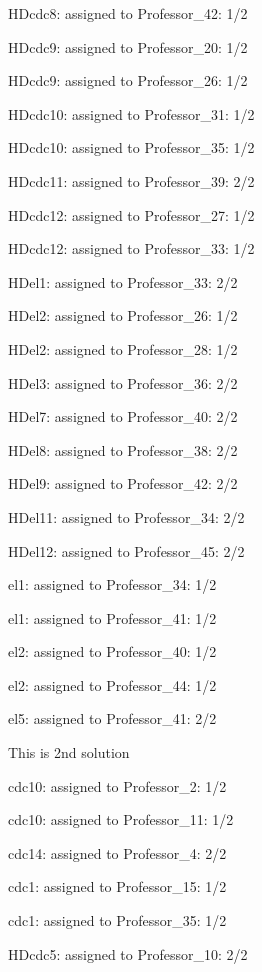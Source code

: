 \documentclass{article} %
\begin{document}
\noindent HDcdc8: assigned to Professor\_42: 1/2

\noindent HDcdc9: assigned to Professor\_20: 1/2

\noindent HDcdc9: assigned to Professor\_26: 1/2

\noindent HDcdc10: assigned to Professor\_31: 1/2

\noindent HDcdc10: assigned to Professor\_35: 1/2

\noindent HDcdc11: assigned to Professor\_39: 2/2

\noindent HDcdc12: assigned to Professor\_27: 1/2

\noindent HDcdc12: assigned to Professor\_33: 1/2

\noindent HDel1: assigned to Professor\_33: 2/2

\noindent HDel2: assigned to Professor\_26: 1/2

\noindent HDel2: assigned to Professor\_28: 1/2

\noindent HDel3: assigned to Professor\_36: 2/2

\noindent HDel7: assigned to Professor\_40: 2/2

\noindent HDel8: assigned to Professor\_38: 2/2

\noindent HDel9: assigned to Professor\_42: 2/2

\noindent HDel11: assigned to Professor\_34: 2/2

\noindent HDel12: assigned to Professor\_45: 2/2

\noindent el1: assigned to Professor\_34: 1/2

\noindent el1: assigned to Professor\_41: 1/2

\noindent el2: assigned to Professor\_40: 1/2

\noindent el2: assigned to Professor\_44: 1/2

\noindent el5: assigned to Professor\_41: 2/2

\noindent 

\noindent  This is 2nd solution

\noindent cdc10: assigned to Professor\_2: 1/2

\noindent cdc10: assigned to Professor\_11: 1/2

\noindent cdc14: assigned to Professor\_4: 2/2

\noindent cdc1: assigned to Professor\_15: 1/2

\noindent cdc1: assigned to Professor\_35: 1/2

\noindent HDcdc5: assigned to Professor\_10: 2/2
\end{document}
